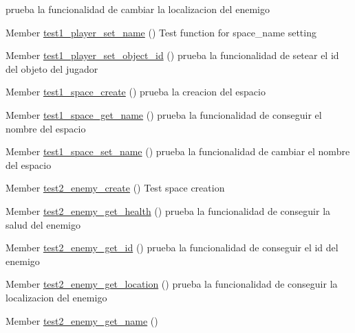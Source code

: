 \begin{DoxyRefList}
%
prueba la funcionalidad de cambiar la localizacion del enemigo  
\item[Member \mbox{\hyperlink{player__test_8h_a9d87c09e6af910d695265e3fd77ae3a2}{test1\+\_\+player\+\_\+set\+\_\+name}} ()]\label{test__test000031}%
%
Test function for space\+\_\+name setting  
\item[Member \mbox{\hyperlink{player__test_8h_aff86a421f7a463d855cf3c4b8e6fd072}{test1\+\_\+player\+\_\+set\+\_\+object\+\_\+id}} ()]\label{test__test000048}%
%
prueba la funcionalidad de setear el id del objeto del jugador  
\item[Member \mbox{\hyperlink{space__test_8h_a69278cc022dc5688d4725f8d36317b30}{test1\+\_\+space\+\_\+create}} ()]\label{test__test000053}%
%
prueba la creacion del espacio  
\item[Member \mbox{\hyperlink{space__test_8h_ad12c42523c517507566c5c68b1527689}{test1\+\_\+space\+\_\+get\+\_\+name}} ()]\label{test__test000058}%
%
prueba la funcionalidad de conseguir el nombre del espacio  
\item[Member \mbox{\hyperlink{space__test_8h_a2569bab6cfeec15f722d232bb8c78c9e}{test1\+\_\+space\+\_\+set\+\_\+name}} ()]\label{test__test000055}%
%
prueba la funcionalidad de cambiar el nombre del espacio  
\item[Member \mbox{\hyperlink{enemy__test_8h_ac000e90fe96bb0662f207e75f824a995}{test2\+\_\+enemy\+\_\+create}} ()]\label{test__test000002}%
%
Test space creation  
\item[Member \mbox{\hyperlink{enemy__test_8h_a9292fdc09417e4a40db2e824d30ec746}{test2\+\_\+enemy\+\_\+get\+\_\+health}} ()]\label{test__test000016}%
%
prueba la funcionalidad de conseguir la salud del enemigo  
\item[Member \mbox{\hyperlink{enemy__test_8h_a3868401da4cf5525d22fe08fab0fecea}{test2\+\_\+enemy\+\_\+get\+\_\+id}} ()]\label{test__test000009}%
%
prueba la funcionalidad de conseguir el id del enemigo  
\item[Member \mbox{\hyperlink{enemy__test_8h_ac4eee5c08c19099c137a155790a7918f}{test2\+\_\+enemy\+\_\+get\+\_\+location}} ()]\label{test__test000014}%
%
prueba la funcionalidad de conseguir la localizacion del enemigo  
\item[Member \mbox{\hyperlink{enemy__test_8h_a6abc351eead7c046b44124c9014201fd}{test2\+\_\+enemy\+\_\+get\+\_\+name}} ()]\label{test__test000007}%

\end{DoxyRefList}

